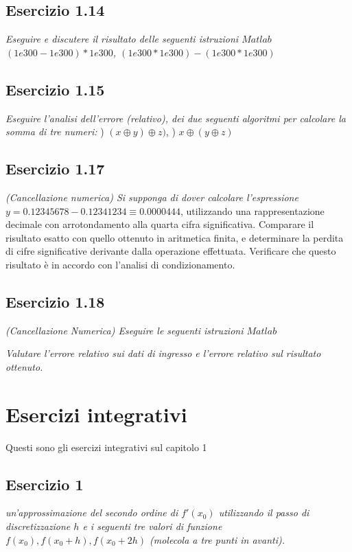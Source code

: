 \subsection{Esercizio 1.14}
\emph{Eseguire e discutere il risultato delle seguenti istruzioni $Matlab$}
\emph{\center $(1e300-1e300)*1e300$, \qquad $(1e300*1e300)-(1e300*1e300)$}
\flushleft

\subsection{Esercizio 1.15}
\emph{Eseguire l'analisi dell'errore (relativo), dei due seguenti algoritmi per calcolare la somma di tre numeri:}
) $ (x\oplus y) \oplus z) $, ) $x\oplus(y\oplus z)$
\flushleft

\subsection{Esercizio 1.17}
\emph{(Cancellazione numerica) Si supponga di dover calcolare l'espressione }
\center $ y = 0.12345678-0.12341234 \equiv 0.0000444$,
\flushleft utilizzando una rappresentazione decimale con arrotondamento alla quarta cifra significativa. Comparare il risultato esatto con quello ottenuto in aritmetica finita, e determinare la perdita di cifre significative derivante dalla operazione effettuata. Verificare che questo risultato è in accordo con l'analisi di condizionamento.

\subsection{Esercizio 1.18}
\emph{(Cancellazione Numerica) Eseguire le seguenti istruzioni $Matlab$}


\emph{Valutare l'errore relativo sui dati di ingresso e l'errore relativo sul risultato ottenuto.}

\section{Esercizi integrativi}
Questi sono gli esercizi integrativi sul capitolo 1


\subsection{Esercizio 1}
\emph{ un'approssimazione del secondo ordine di $f'(x_{0})$ utilizzando il passo di discretizzazione $ h $ e i seguenti tre valori di funzione $ f(x_{0}), f(x_{0}+h), f(x_{0}+2h) $ (molecola a tre punti in avanti).}

